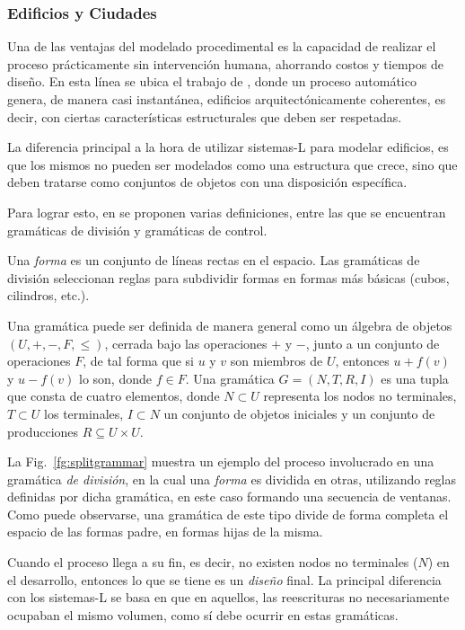 \subsubsection{Edificios y Ciudades}
Una de las ventajas del modelado procedimental es la capacidad de realizar el proceso prácticamente sin intervención humana, ahorrando costos y tiempos de diseño.
En esta línea se ubica el trabajo de \cite{Wonka2003}, donde un proceso automático genera, de manera casi instantánea, edificios arquitectónicamente coherentes, es decir, con ciertas características estructurales que deben ser respetadas.

La diferencia principal a la hora de utilizar sistemas-L para modelar edificios, es que los mismos no pueden ser modelados como una estructura que crece, sino que deben tratarse como conjuntos de objetos con una disposición específica.

Para lograr esto, en \cite{Wonka2003} se proponen varias definiciones, entre las que se encuentran gramáticas de división y gramáticas de control.

Una {\em forma} es un conjunto de líneas rectas en el espacio.
Las gramáticas de división seleccionan reglas para subdividir formas en formas más básicas (cubos, cilindros, etc.).


Una gramática puede ser definida de manera general como un álgebra de objetos $(U,+,-,F,\leq)$, cerrada bajo las operaciones $+$ y $-$, junto a un conjunto de operaciones $F$, de tal forma que si $u$ y $v$ son miembros de $U$, entonces $u+f(v)$ y $u-f(v)$ lo son, donde $f \in F$.
Una gramática $G=(N,T,R,I)$ es una tupla que consta de cuatro elementos, donde $N \subset U$ representa los nodos no terminales, $T \subset U$ los terminales, $I \subset N$ un conjunto de objetos iniciales y un conjunto de producciones $R \subseteq U \times U$.


La Fig.~\ref{fg:splitgrammar} muestra un ejemplo del proceso involucrado en una gramática {\em de división}, en la cual una {\em forma} es dividida en otras, utilizando reglas definidas por dicha gramática, en este caso formando una secuencia de ventanas.
Como puede observarse, una gramática de este tipo divide de forma completa el espacio de las formas padre, en formas hijas de la misma.

Cuando el proceso llega a su fin, es decir, no existen nodos no terminales ($N$) en el desarrollo, entonces lo que se tiene es un {\em diseño} final.
La principal diferencia con los sistemas-L se basa en que en aquellos, las reescrituras no necesariamente ocupaban el mismo volumen, como sí debe ocurrir en estas gramáticas.

